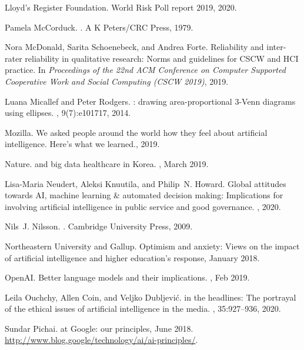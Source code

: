 \documentclass[11pt]{article} %
\begin{document}
\begin{thebibliography}{10}
{Lloyd’s Register Foundation}.
\newblock World {R}isk {P}oll report 2019, 2020.

Pamela McCorduck.
.
\newblock A K Peters/CRC Press, 1979.

Nora McDonald, Sarita Schoenebeck, and Andrea Forte.
\newblock Reliability and inter-rater reliability in qualitative research:
  Norms and guidelines for {CSCW} and {HCI} practice.
\newblock In {\em Proceedings of the 22nd ACM Conference on Computer Supported
  Cooperative Work and Social Computing (CSCW 2019)}, 2019.

Luana Micallef and Peter Rodgers.
: drawing area-proportional 3-{V}enn diagrams using
  ellipses.
, 9(7):e101717, 2014.

Mozilla.
\newblock We asked people around the world how they feel about artificial
  intelligence. {H}ere's what we learned., 2019.

Nature.
 and big data healthcare in {K}orea.
, March 2019.

Lisa-Maria Neudert, Aleksi Knuutila, and Philip~N. Howard.
\newblock Global attitudes towards {AI}, machine learning \& automated decision
  making: Implications for involving artificial intelligence in public service
  and good governance.
, 2020.

Nils~J. Nilsson.
.
\newblock Cambridge University Press, 2009.

{Northeastern University and Gallup}.
\newblock Optimism and anxiety: Views on the impact of artificial intelligence
  and higher education's response, January 2018.

OpenAI.
\newblock Better language models and their implications.
, Feb 2019.

Leila Ouchchy, Allen Coin, and Veljko Dubljevi{\'c}.
 in the headlines: The portrayal of the ethical issues of
  artificial intelligence in the media.
, 35:927--936, 2020.

Sundar Pichai.
 at {G}oogle: our principles, June 2018.
\newblock \url{http://www.blog.google/technology/ai/ai-principles/}.


\end{thebibliography}
\end{document}
